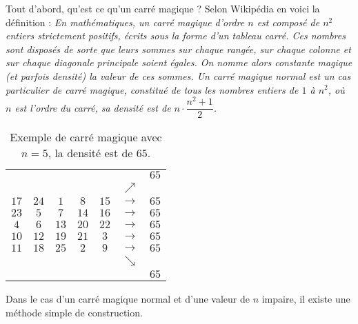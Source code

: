 

\begin{table}[htbp]
\begin{minipage}{0.5\textwidth}
Tout d'abord, qu'est ce qu'un carré magique ? Selon Wikipédia en voici la définition :
\textsl{\og En mathématiques, un carré magique d'ordre $n$ est composé de $n^2$ entiers strictement positifs, écrits sous la forme d'un tableau carré. Ces nombres sont disposés de sorte que leurs sommes sur chaque rangée, sur chaque colonne et sur chaque diagonale principale soient égales. On nomme alors constante magique (et parfois densité) la valeur de ces sommes. Un carré magique normal est un cas particulier de carré magique, constitué de tous les nombres entiers de $1$ à $n^2$, où $n$ est l'ordre du carré, sa densité est de $n\cdot\dfrac{n^2+1}{2}$.\fg}
\end{minipage}
\begin{minipage}{0.5\textwidth}
\renewcommand{\arraystretch}{1.5}

	\centering
		\begin{tabular}{|*{5}{c|}cc}
			\multicolumn{6}{r}{}                &$65$\\
		  \multicolumn{6}{r}{$\nearrow$}      &   \\
			\cline{1-5}
			$17$&$24$&$1$&$8$&$15$&$\rightarrow$&$65$\\
			\cline{1-5}
			$23$&$5$&$7$&$14$&$16$&$\rightarrow$&$65$\\
			\cline{1-5}
			$4$&$6$&$13$&$20$&$22$&$\rightarrow$&$65$\\
			\cline{1-5}
			$10$&$12$&$19$&$21$&$3$&$\rightarrow$&$65$\\
			\cline{1-5}
			$11$&$18$&$25$&$2$&$9$&$\rightarrow$&$65$\\
			\cline{1-5}
			\multicolumn{6}{r}{$\searrow$}      &   \\
			\multicolumn{6}{r}{}                &$65$\\
		  
		\end{tabular}
		\caption{Exemple de carré magique avec $n=5$, la densité est de $65$.}
\end{minipage}
\end{table}
\renewcommand{\arraystretch}{1}



Dans le cas d'un carré magique normal et d'une valeur de $n$ impaire, il existe une méthode simple de construction.

